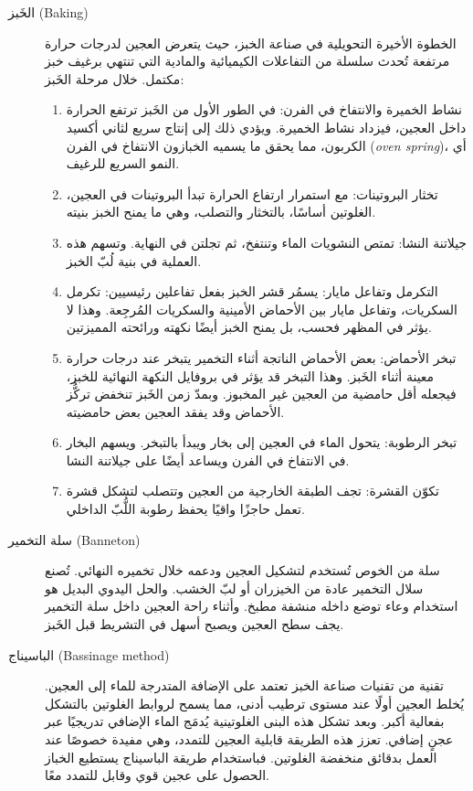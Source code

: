 \begin{description}
\item[الخَبز \textenglish{(Baking)}]
الخطوة الأخيرة التحويلية في صناعة الخبز، حيث يتعرض العجين لدرجات حرارة مرتفعة تُحدث سلسلة من التفاعلات الكيميائية والمادية التي تنتهي برغيف خبز مكتمل. خلال مرحلة الخَبز:
\begin{enumerate}
    \item نشاط الخميرة والانتفاخ في الفرن: في الطور الأول من الخَبز ترتفع الحرارة داخل العجين، فيزداد نشاط الخميرة. ويؤدي ذلك إلى إنتاج سريع لثاني أكسيد الكربون، مما يحقق ما يسميه الخبازون الانتفاخ في الفرن \textenglish{(\emph{oven spring})}، أي النمو السريع للرغيف.
    \item تخثار البروتينات: مع استمرار ارتفاع الحرارة تبدأ البروتينات في العجين، الغلوتين أساسًا، بالتخثار والتصلب، وهي ما يمنح الخبز بنيته.
    \item جيلاتنة النشا: تمتص النشويات الماء وتنتفخ، ثم تجلتن في النهاية. وتسهم هذه العملية في بنية لُبّ الخبز.
    \item التكرمل وتفاعل مايار: يسمُر قشر الخبز بفعل تفاعلين رئيسيين: تكرمل السكريات، وتفاعل مايار بين الأحماض الأمينية والسكريات المُرجِعة. وهذا لا يؤثر في المظهر فحسب، بل يمنح الخبز أيضًا نكهته ورائحته المميزتين.
    \item تبخر الأحماض: بعض الأحماض الناتجة أثناء التخمير يتبخر عند درجات حرارة معينة أثناء الخَبز. وهذا التبخر قد يؤثر في بروفايل النكهة النهائية للخبز، فيجعله أقل حامضية من العجين غير المخبوز. وبمدّ زمن الخَبز تنخفض تركُّز الأحماض وقد يفقد العجين بعض حامضيته.
    \item تبخر الرطوبة: يتحول الماء في العجين إلى بخار ويبدأ بالتبخر. ويسهم البخار في الانتفاخ في الفرن ويساعد أيضًا على جيلاتنة النشا.
    \item تكوّن القشرة: تجف الطبقة الخارجية من العجين وتتصلب لتشكل قشرة تعمل حاجزًا واقيًا يحفظ رطوبة اللُّبّ الداخلي.
\end{enumerate}

\item[سلة التخمير \textenglish{(Banneton)}]
سلة من الخوص تُستخدم لتشكيل العجين ودعمه خلال تخميره النهائي. تُصنع سلال التخمير عادة من الخيزران أو لبّ الخشب. والحل اليدوي البديل هو استخدام وعاء توضع داخله منشفة مطبخ. وأثناء راحة العجين داخل سلة التخمير يجف سطح العجين ويصبح أسهل في التشريط قبل الخَبز.

\item[الباسيناج \textenglish{(Bassinage method)}]
تقنية من تقنيات صناعة الخبز تعتمد على الإضافة المتدرجة للماء إلى العجين. يُخلط العجين أولًا عند مستوى ترطيب أدنى، مما يسمح لروابط الغلوتين بالتشكل بفعالية أكبر. وبعد تشكل هذه البنى الغلوتينية يُدمَج الماء الإضافي تدريجيًا عبر عجنٍ إضافي. تعزز هذه الطريقة قابلية العجين للتمدد، وهي مفيدة خصوصًا عند العمل بدقائق منخفضة الغلوتين. فباستخدام طريقة الباسيناج يستطيع الخباز الحصول على عجين قوي وقابل للتمدد معًا.


\end{description}
